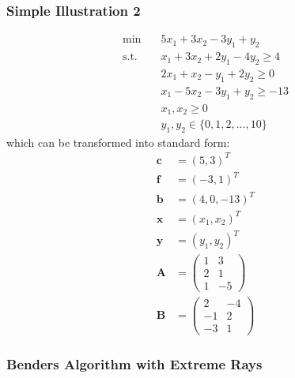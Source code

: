 \documentclass[fleqn,10pt]{wlscirep}
\begin{document}
\subsubsection{Simple Illustration 2}

\begin{align}
\min \quad & 5 x_1 + 3 x_2 - 3 y_1 + y_2 \\
\text{s.t.} \quad & x_1 + 3 x_2 + 2 y_1 - 4 y_2 \geq 4 \\
& 2 x_1 + x_2 - y_1 + 2 y_2 \geq 0 \\ 
& x_1 - 5 x_2 - 3 y_1 + y_2 \geq-13 \\ 
& x_1, x_2  \geq 0 \\
& y_1, y_2 \in \{0, 1, 2, ..., 10 \}
\end{align}
which can be transformed into standard form:
\begin{align}
	\mathbf{c} &= (5, 3)^T \\
    \mathbf{f} &= (-3, 1)^T \\
    \mathbf{b} &= (4, 0, -13)^T \\
    \mathbf{x} &= (x_1, x_2)^T \\
    \mathbf{y} &= (y_1, y_2)^T \\
    \mathbf{A} &= \left(\begin{array}{c}
    	1 & 3\\
        2 & 1 \\
        1 & -5
    \end{array} \right) \\
    \mathbf{B} &= \left(\begin{array}{c}
    	2 & -4 \\
        -1 & 2 \\
        -3 & 1
    \end{array} \right)
\end{align}
\subsubsection{Benders Algorithm with Extreme Rays}
\end{document}
